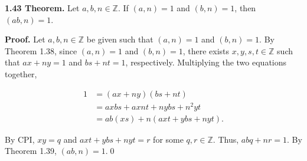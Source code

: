 \documentclass[12pt]{article}
\begin{document}
\noindent\textbf{1.43 Theorem.} Let $a,b,n\in\mathbb{Z}$. If $(a,n)=1$ and $(b,n)=1$, then $(ab,n)=1$.

\bigskip

\noindent\textbf{Proof.} Let $a,b,n\in\mathbb{Z}$ be given such that $(a,n)=1$ and $(b,n)=1$. By Theorem 1.38, since $(a,n)=1$ and $(b,n)=1$, there exists $x,y,s,t\in\mathbb{Z}$ such that $ax+ny=1$ and $bs+nt=1$, respectively. Multiplying the two equations together,

\begin{align*}
1 &= (ax+ny)(bs+nt) \\
&= axbs + axnt + nybs + n^2yt\\
&= ab(xs) + n(axt + ybs + nyt).
\end{align*}

\noindent By CPI, $xy=q$ and $axt + ybs + nyt=r$ for some $q,r\in\mathbb{Z}$. Thus, $abq + nr = 1$. By Theorem 1.39, $(ab,n)=1$.\qed
\end{document}
